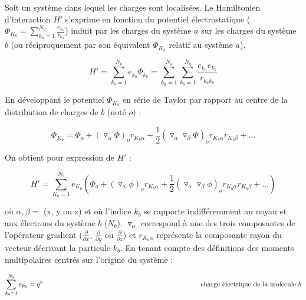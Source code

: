	Soit un système dans lequel les charges sont localisées. Le Hamiltonien d'interaction $H'$ s'exprime en fonction du potentiel électrostatique ($\Phi_{K_{b}}= \sum_{k_{a}=1}^{N_{a}} \frac{e_{k_{a}}}{r_{k_{a}}}$) induit par les charges du système $a$ sur les charges du système $b$ (ou réciproquement par son équivalent $\Phi_{K_{a}}$ relatif au système $a$).
	
	\begin{equation}
	H' = \sum_{k_{b}=1}^{N_{b}} e_{k_{b}} \Phi_{k_{b}} = \sum_{k_{a}=1}^{N_{a}} \sum_{k_{b}=1}^{N_{b}} \frac{e_{k_{a}} e_{k_{b}}}{r_{k_{a}k_{b}}}
	\end{equation}
	
	En développant le potentiel $\Phi_{K_{b}}$ en série de Taylor par rapport au centre de la distribution de charges de $b$ (noté $o$) :
	
	\begin{equation}
	\Phi_{K_{b}} = \Phi_{o} + (\triangledown_{\alpha} \Phi)_{o} r_{K_{b}\alpha} + \frac{1}{2} (\triangledown_{\alpha} \triangledown_{\beta} \Phi)_{o} r_{K_{b}\alpha} r_{K_{b}\beta} + \ldots
	\end{equation}
	
	On obtient pour expression de $H'$ : 
	
	\begin{equation}
	H' = \sum_{K_{b}=1}^{N_{b}} e_{K_{b}} \left(\Phi_{o} + (\triangledown_{\alpha} \phi)_{o} r_{K_{b}\alpha} + \frac{1}{2}(\triangledown_{\alpha} \triangledown_{\beta}\phi)_{o} r_{K_{b}\alpha} r_{K_{b}\beta} + \ldots \right)
	\end{equation}
	
	\noindent où $\alpha,\beta=$ (x, y ou z) et où l'indice $k_{b}$ se rapporte indifféremment au noyau et aux électrons du système $b$ ($N_{b}$). $\triangledown_{\alpha}$ correspond à une des trois composantes de l'opérateur gradient ($\frac{\partial}{\partial x}$, $\frac{\partial}{\partial y}$ ou $\frac{\partial}{\partial z}$) et $r_{K_{b}\alpha}$ représente la composante rayon du vecteur décrivant la particule $k_{b}$. En tenant compte des définitions des moments multipolaires centrés sur l'origine du système : 
	
	\begin{flushleft}
		\begin{equation*}
		\sum_{k_{b}=1}^{N_{b}} e_{k_{b}} = q^{b} \hspace{8.1cm}\textup{charge électrique de la molecule $b$}     
		\end{equation*}
	\end{flushleft}
	
